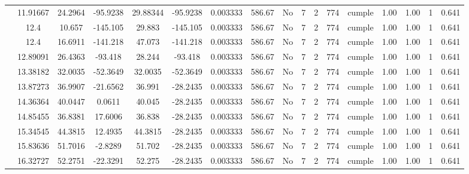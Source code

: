 \begin{table}[H]
{\begin{tabular}{|c|c|c|c|c|c|c|c|c|c|c|c|c|c|c|c|c|}
\cline{2-17}    & 11.91667 & 24.2964 & -95.9238 & 29.88344 & -95.9238 & 0.003333 & 586.67 & No  & 7   & 2   & 774 & \cellcolor[rgb]{ .776,  .937,  .808}cumple & 1.00 & 1.00 & 1   & 0.641 \bigstrut\\
\cline{2-17}    & \cellcolor[rgb]{ .851,  .882,  .949}12.4 & 10.657 & -145.105 & 29.883 & -145.105 & 0.003333 & 586.67 & No  & 7   & 2   & 774 & \cellcolor[rgb]{ .776,  .937,  .808}cumple & 1.00 & 1.00 & 1   & 0.641 \bigstrut\\
\cline{2-17}    & \cellcolor[rgb]{ .851,  .882,  .949}12.4 & 16.6911 & -141.218 & 47.073 & -141.218 & 0.003333 & 586.67 & No  & 7   & 2   & 774 & \cellcolor[rgb]{ .776,  .937,  .808}cumple & 1.00 & 1.00 & 1   & 0.641 \bigstrut\\
\cline{2-17}    & 12.89091 & 26.4363 & -93.418 & 28.244 & -93.418 & 0.003333 & 586.67 & No  & 7   & 2   & 774 & \cellcolor[rgb]{ .776,  .937,  .808}cumple & 1.00 & 1.00 & 1   & 0.641 \bigstrut\\
\cline{2-17}    & 13.38182 & 32.0035 & -52.3649 & 32.0035 & -52.3649 & 0.003333 & 586.67 & No  & 7   & 2   & 774 & \cellcolor[rgb]{ .776,  .937,  .808}cumple & 1.00 & 1.00 & 1   & 0.641 \bigstrut\\
\cline{2-17}    & 13.87273 & 36.9907 & -21.6562 & 36.991 & -28.2435 & 0.003333 & 586.67 & No  & 7   & 2   & 774 & \cellcolor[rgb]{ .776,  .937,  .808}cumple & 1.00 & 1.00 & 1   & 0.641 \bigstrut\\
\cline{2-17}    & 14.36364 & 40.0447 & 0.0611 & 40.045 & -28.2435 & 0.003333 & 586.67 & No  & 7   & 2   & 774 & \cellcolor[rgb]{ .776,  .937,  .808}cumple & 1.00 & 1.00 & 1   & 0.641 \bigstrut\\
\cline{2-17}    & 14.85455 & 36.8381 & 17.6006 & 36.838 & -28.2435 & 0.003333 & 586.67 & No  & 7   & 2   & 774 & \cellcolor[rgb]{ .776,  .937,  .808}cumple & 1.00 & 1.00 & 1   & 0.641 \bigstrut\\
\cline{2-17}    & 15.34545 & 44.3815 & 12.4935 & 44.3815 & -28.2435 & 0.003333 & 586.67 & No  & 7   & 2   & 774 & \cellcolor[rgb]{ .776,  .937,  .808}cumple & 1.00 & 1.00 & 1   & 0.641 \bigstrut\\
\cline{2-17}    & 15.83636 & 51.7016 & -2.8289 & 51.702 & -28.2435 & 0.003333 & 586.67 & No  & 7   & 2   & 774 & \cellcolor[rgb]{ .776,  .937,  .808}cumple & 1.00 & 1.00 & 1   & 0.641 \bigstrut\\
\cline{2-17}    & 16.32727 & 52.2751 & -22.3291 & 52.275 & -28.2435 & 0.003333 & 586.67 & No  & 7   & 2   & 774 & \cellcolor[rgb]{ .776,  .937,  .808}cumple & 1.00 & 1.00 & 1   & 0.641 \bigstrut\\

\end{tabular}}
\end{table}

